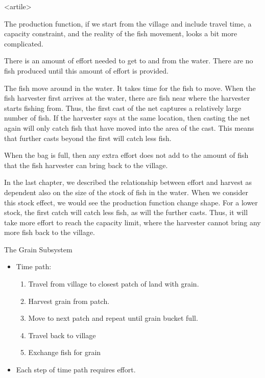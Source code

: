 \mode<artile>{
	The production function, if we start from the village and include travel time, a capacity constraint, and the reality of the fish movement, looks a bit more complicated.  
	
	There is an amount of effort needed to get to and from the water.  There are no fish produced until this amount of effort is provided.  
	
	The fish move around in the water.  It takes time for the fish to move.  When the fish harvester first arrives at the water, there are fish near where the harvester starts fishing from.  Thus, the first cast of the net captures a relatively large number of fish.  If the harvester says at the same location, then casting the net again will only catch fish that have moved into the area of the cast.  This means that further casts beyond the first will catch less fish.
	
	When the bag is full, then any extra effort does not add to the amount of fish that the fish harvester can bring back to the village.
	
	In the last chapter, we described the relationship between effort and harvest as dependent also on the size of the stock of fish in the water.  When we consider this stock effect, we would see the production function change shape.  For a lower stock, the first catch will catch less fish, as will the further casts.  Thus, it will take more effort to reach the capacity limit, where the harvester cannot bring any more fish back to the village.
}

\begin{frame}{The Grain Subsystem}
	\begin{itemize}
		\item Time path:
		\begin{enumerate}
			\item Travel from village to closest patch of land with grain.
			\item Harvest grain from patch.
			\item Move to next patch and repeat until grain bucket full.
			\item Travel back to village
			\item Exchange fish for grain
		\end{enumerate}
		\item Each step of time path requires effort.
	\end{itemize}
\end{frame}

